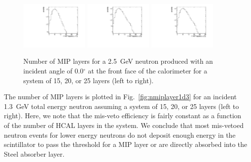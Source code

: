 \begin{figure}[hbtp]
\begin{center}
    \includegraphics[width=0.3\textwidth]{images/hcal/nMIPLayers15_e2d5.pdf}
    \includegraphics[width=0.3\textwidth]{images/hcal/nMIPLayers20_e2d5.pdf}
    \includegraphics[width=0.3\textwidth]{images/hcal/nMIPLayers25_e2d5.pdf}    
    \caption{Number of MIP layers for a 2.5~GeV neutron produced with an incident angle of 0.0$^{\circ}$ at the front face of the calorimeter for a system of 15, 20, or 25 layers (left to right). }
 \label{fig:nmiplayer2d5}
 \end{center}
\end{figure}

The number of MIP layers is plotted in Fig.~\ref{fig:nmiplayer1d3} for an incident 1.3~GeV total energy neutron assuming a system of 15, 20, or 25 layers (left to right). 
Here, we note that the mis-veto efficiency is fairly constant as a function of the number of HCAL layers in the system.
We conclude that most mis-vetoed neutron events for lower energy neutrons do not deposit enough energy in the scintillator to pass the threshold for a MIP layer or are directly absorbed into the Steel absorber layer.

